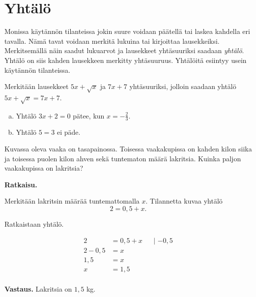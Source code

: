 \chapter{Yhtälö}

Monissa käytännön tilanteissa jokin suure voidaan päätellä tai laskea kahdella eri tavalla. Nämä tavat voidaan merkitä lukuina tai kirjoittaa lausekkeiksi. Merkitsemällä näin saadut lukuarvot ja lausekkeet yhtäsuuriksi saadaan \emph{yhtälö}. Yhtälö on siis kahden lausekkeen merkitty yhtäsuuruus. Yhtälöitä esiintyy usein käytännön tilanteissa.

\begin{esimerkki}
Merkitään lausekkeet $5x+\sqrt{x}$ ja $7x+7$ yhtäsuuriksi, jolloin saadaan
yhtälö $5x+\sqrt{x} = 7x+7$.
\end{esimerkki}


\begin{esimerkki}
\begin{enumerate}[a)]
\item Yhtälö $3x + 2 = 0$ pätee, kun $x = - \frac{2}{3}$.
\item Yhtälö $5 = 3$ ei päde.
\end{enumerate}
\end{esimerkki}


\begin{esimerkki}
Kuvassa oleva vaaka on tasapainossa. Toisessa vaakakupissa on kahden kilon siika ja toisessa puolen kilon ahven sekä tuntematon määrä lakritsia. Kuinka paljon vaakakupissa on lakritsia?

\textbf{Ratkaisu.}

Merkitään lakritsin määrää tuntemattomalla $x$. Tilannetta kuvaa yhtälö
\begin{equation*}
2 = 0{,5} + x.
\end{equation*}

Ratkaistaan yhtälö.

\begin{align*}
2 &= 0{,5} + x &&\text{| $-0{,5}$} \\
2 - 0{,5} &= x && \\
1{,5} &= x && \\
x &= 1{,5} && \\
\end{align*}


\textbf{Vastaus.} Lakritsia on $1{,5}$ kg.
\end{esimerkki}

